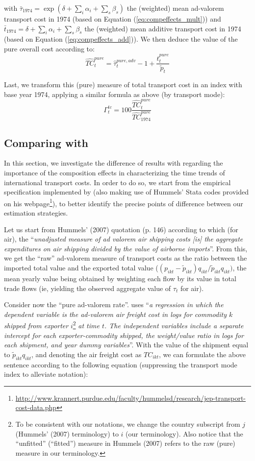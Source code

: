 \documentclass[a4paper,11pt]{article}
\begin{document}
\noindent with $\bar{\tau}_{1974} = \exp(\delta + \sum_i \alpha_i + \sum_s \beta_s)$ the (weighted) mean ad-valorem transport cost in 1974 (based on Equation (\ref{eq:compeffects_mult})) and $\bar{t}_{1974} = \delta + \sum_i \alpha_i + \sum_s \beta_s$ the (weighted) mean additive transport cost in 1974 (based on Equation (\ref{eq:compeffects_add})). We then deduce the value of the pure overall cost according to:
$$\widehat{TC}^{pure}_t= \widehat{\tau}^{pure, adv}_t -1 + \frac{\widehat{t}^{pure}_t}{\widetilde{p}_t}$$

Last, we transform this (pure) measure of total transport cost in an index with base year 1974, applying a similar formula as above (by transport mode):
$$\Gamma^{tc}_t = 100\frac{\widehat{TC}^{pure}_t}{\widehat{TC}^{pure}_{1974}}$$


\subsection{Comparing with \cite{hummels2007} \label{app:compare_Hummels}}

In this section, we investigate the difference of results with \cite{hummels2007} regarding the importance of the composition effects in characterizing the time trends of international transport costs.
In order to do so, we start from the empirical specification implemented by \cite{hummels2007} (also making use of Hummels' Stata codes provided on his webpage\footnote{\url{http://www.krannert.purdue.edu/faculty/hummelsd/research/jep-transport-cost-data.php}}), to better identify the precise points of difference between our estimation strategies.

Let us start from Hummels' (2007) quotation (p.
146) according to which (for air), the ``\textit{unadjusted measure of ad valorem air shipping costs [is] the aggregate expenditures on air shipping divided by the value of airborne imports}''.
From this, we get the ``raw'' ad-valorem measure of transport costs as the ratio between the imported total value and the exported total value ($(p_{ikt} - \widetilde{p}_{ikt})q_{ikt}/\widetilde{p}_{ikt}q_{ikt})$, the mean yearly value being obtained by weighting each flow by its value in total trade flows (ie, yielding the observed aggregate value of $\tau_t$ for air).

Consider now the ``pure ad-valorem rate''.
\cite{hummels2007} uses ``\textit{a regression in which the dependent variable is the ad-valorem air freight cost in logs for commodity $k$ shipped from exporter} $i$\footnote{To be consistent with our notations, we change the country subscript from $j$ (Hummels' (2007) terminology) to $i$ (our terminology). Also notice that the ``unfitted'' (``fitted'') measure in Hummels (2007) refers to the raw (pure) measure in our terminology.} \textit{at time $t$.
The independent variables include a separate intercept for each exporter-commodity shipped, the weight/value ratio in logs for each shipment, and year dummy variables}''.
With the value of the shipment equal to $\widetilde{p}_{ikt}q_{ikt}$, and denoting the air freight cost as $TC_{ikt}$, we can formulate the above sentence according to the following equation (suppressing the transport mode index to alleviate notation):
\end{document}
